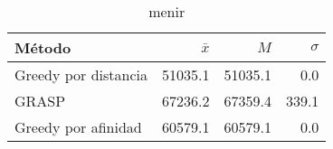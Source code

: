 \begin{table}[h!]
\centering
\begin{tabular}{|l|r|r|r|}
\hline
              Método &  $\bar{x}$ &     $M$ &  $\sigma$ \\
\hline
Greedy por distancia &    51035.1 & 51035.1 &       0.0 \\
               GRASP &    67236.2 & 67359.4 &     339.1 \\
 Greedy por afinidad &    60579.1 & 60579.1 &       0.0 \\
\hline
\end{tabular}
\caption{menir}
\label{menir}
\end{table}
